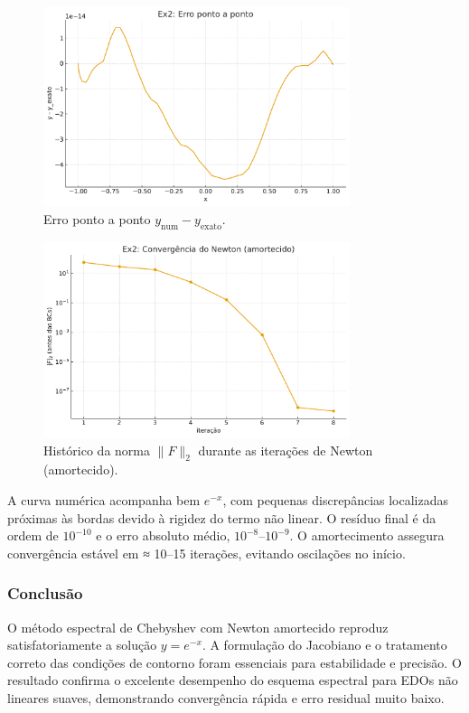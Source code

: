 \documentclass[12pt,a4paper]{article}
\begin{document}
\begin{figure}[h!]
\centering
\includegraphics[width=0.8\textwidth]{figures/ex2_pointwise_error.pdf}
\caption{Erro ponto a ponto \(y_{\text{num}}-y_{\text{exato}}\).}
\end{figure}

\begin{figure}[h!]
\centering
\includegraphics[width=0.8\textwidth]{figures/ex2_convergence_normF.pdf}
\caption{Histórico da norma \(\|F\|_2\) durante as iterações de Newton (amortecido).}
\end{figure}

A curva numérica acompanha bem \(e^{-x}\), com pequenas discrepâncias localizadas próximas às bordas devido à rigidez do termo não linear.  
O resíduo final é da ordem de \(10^{-10}\) e o erro absoluto médio, \(10^{-8}\)–\(10^{-9}\).  
O amortecimento assegura convergência estável em ≈ 10–15 iterações, evitando oscilações no início.

\subsubsection*{Conclusão}
O método espectral de Chebyshev com Newton amortecido reproduz satisfatoriamente a solução \(y=e^{-x}\).  
A formulação do Jacobiano e o tratamento correto das condições de contorno foram essenciais para estabilidade e precisão.  
O resultado confirma o excelente desempenho do esquema espectral para EDOs não lineares suaves, demonstrando convergência rápida e erro residual muito baixo.
\end{document}
